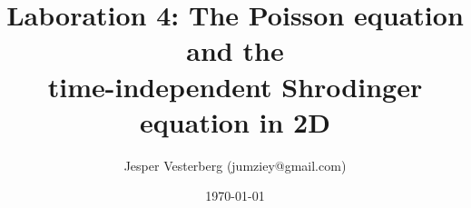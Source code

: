 \title{Laboration 4: The Poisson equation and the \\time-independent Shrodinger equation in 2D}
\author{Jesper Vesterberg (jumziey@gmail.com)}
\date{\today}

\begin{titlepage}
  \maketitle
  \thispagestyle{fancy}
  \rhead{\today}
\end{titlepage}

